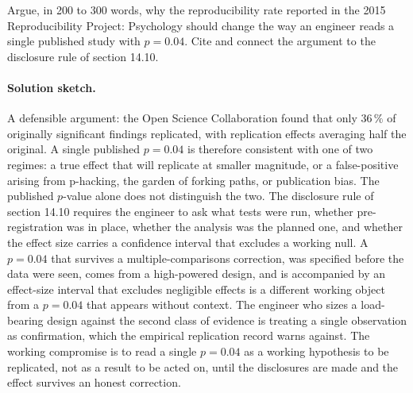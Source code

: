 \begin{exercise}
Argue, in 200 to 300 words, why the reproducibility rate reported
in the 2015 Reproducibility Project: Psychology should change the
way an engineer reads a single published study with $p = 0.04$.
Cite \cite{method:open-science-collaboration-2015} and connect the
argument to the disclosure rule of section 14.10.

\paragraph{Solution sketch.} A defensible argument: the Open
Science Collaboration found that only $36\,\%$ of originally
significant findings replicated, with replication effects
averaging half the original. A single published $p = 0.04$ is
therefore consistent with one of two regimes: a true effect
that will replicate at smaller magnitude, or a false-positive
arising from p-hacking, the garden of forking paths, or
publication bias. The published $p$-value alone does not
distinguish the two. The disclosure rule of section 14.10
requires the engineer to ask what tests were run, whether
pre-registration was in place, whether the analysis was the
planned one, and whether the effect size carries a confidence
interval that excludes a working null. A $p = 0.04$ that
survives a multiple-comparisons correction, was specified before
the data were seen, comes from a high-powered design, and is
accompanied by an effect-size interval that excludes negligible
effects is a different working object from a $p = 0.04$ that
appears without context. The engineer who sizes a load-bearing
design against the second class of evidence is treating a single
observation as confirmation, which the empirical replication
record warns against. The working compromise is to read a
single $p = 0.04$ as a working hypothesis to be replicated, not
as a result to be acted on, until the disclosures are made and
the effect survives an honest correction.
\end{exercise}

